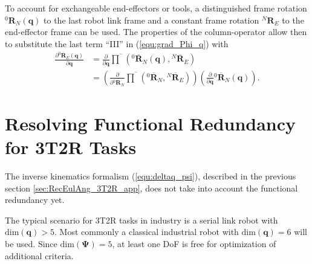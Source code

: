 \documentclass{svproc}
\newcommand{\bm}[1]{\boldsymbol{#1}}
\newcommand{\rotmat}[2]{{{ }^{#1}\boldsymbol{R}}_{#2}}
\newcommand{\rotmato}[2]{{{ }^{#1}\boldsymbol{\overline{R}}}_{#2}}
\begin{document}
To account for exchangeable end-effectors or tools, a distinguished frame rotation $\rotmat{0}{N}(\bm{q})$ to the last robot link frame and a constant frame rotation $\rotmat{N}{E}$ to the end-effector frame can be used.
The properties of the column-operator allow then to substitute the last term ``III'' in (\ref{equ:grad_Phi_q}) with
%
\begin{align}
\frac{\partial \rotmato{0}{E}(\bm{q})}{\partial \bm{q}} 
&=
\frac{\partial}{\partial \bm{q}} \overline{\prod}\left( \rotmato{0}{N}(\bm{q}), \rotmato{N}{E}\right) \label{equ:ee_rotation_gradq}\\
&=
\left(\frac{\partial}{\partial \rotmato{0}{N}} \overline{\prod}\left( \rotmato{0}{N}, \rotmato{N}{E}\right)\right)
\left(\frac{\partial}{\partial \bm{q}} \rotmato{0}{N}(\bm{q})\right). \nonumber
\end{align}
%

\section{Resolving Functional Redundancy for 3T2R Tasks}
\label{sec:ResFuncRed}


The inverse kinematics formalism (\ref{equ:deltaq_psi}), described in the previous section \ref{sec:RecEulAng_3T2R_app}, does not take into account the functional redundancy yet.

The typical scenario for 3T2R tasks in industry is a serial link robot with $\mathrm{dim}(\bm{q})>5$.
Most commonly a classical industrial robot with $\mathrm{dim}(\bm{q})=6$ will be used.
Since $\mathrm{dim}(\bm{\Psi})=5$, at least one DoF is free for optimization of additional criteria.
\end{document}
